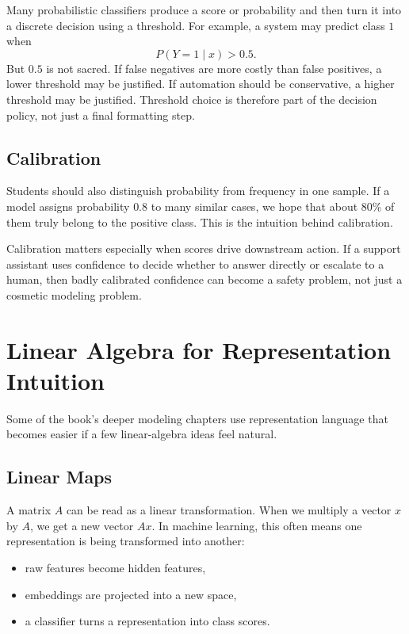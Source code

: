 Many probabilistic classifiers produce a score or probability and then turn it into a discrete decision using a threshold. For example, a system may predict class $1$ when
\[
P(Y=1 \mid x) > 0.5.
\]
But $0.5$ is not sacred. If false negatives are more costly than false positives, a lower threshold may be justified. If automation should be conservative, a higher threshold may be justified. Threshold choice is therefore part of the decision policy, not just a final formatting step.

\subsection{Calibration}

Students should also distinguish probability from frequency in one sample. If a model assigns probability $0.8$ to many similar cases, we hope that about $80\%$ of them truly belong to the positive class. This is the intuition behind calibration.

Calibration matters especially when scores drive downstream action. If a support assistant uses confidence to decide whether to answer directly or escalate to a human, then badly calibrated confidence can become a safety problem, not just a cosmetic modeling problem.

\section{Linear Algebra for Representation Intuition}

Some of the book's deeper modeling chapters use representation language that becomes easier if a few linear-algebra ideas feel natural.

\subsection{Linear Maps}

A matrix $A$ can be read as a linear transformation. When we multiply a vector $x$ by $A$, we get a new vector $Ax$. In machine learning, this often means one representation is being transformed into another:
\begin{itemize}[leftmargin=*]
\item raw features become hidden features,
\item embeddings are projected into a new space,
\item a classifier turns a representation into class scores.
\end{itemize}

